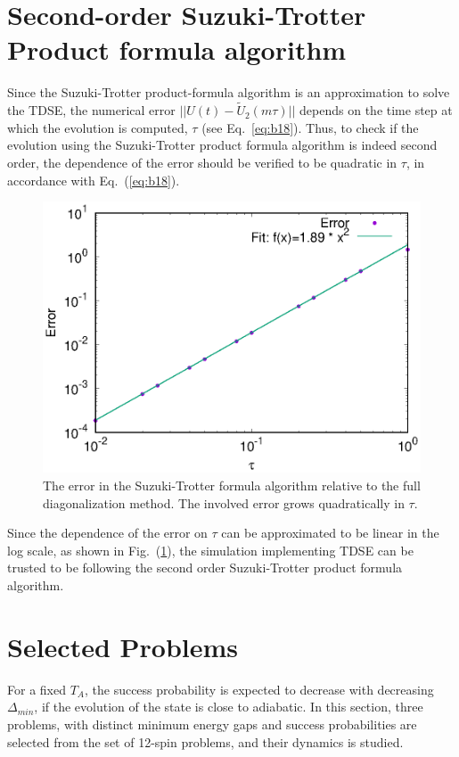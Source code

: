 \documentclass[../main.tex]{subfiles}
\begin{document}
\section{Second-order Suzuki-Trotter Product formula algorithm}
Since the Suzuki-Trotter product-formula algorithm is an approximation to solve the TDSE, the numerical error $\lvert \lvert U(t)-\tilde{U}_2(m \tau) \rvert \rvert $ depends on the time step at which the evolution is computed, $\tau$ (see Eq.~\ref{eq:b18}). 
Thus, to check if the evolution using the Suzuki-Trotter product formula algorithm is indeed second order, the dependence of the error should be verified to be quadratic in $\tau$, in accordance with Eq.~(\ref{eq:b18}). 
\begin{figure}[H]
\centering 
\includegraphics[scale=0.8]{Error.eps}
\caption{The error in the Suzuki-Trotter formula algorithm relative to the full diagonalization method. The involved error grows quadratically in $\tau$.}
\label{fig:o1}
\end{figure}
Since the dependence of the error on $\tau$ can be approximated to be linear in the log scale, as shown in Fig.~(\ref{fig:o1}), the simulation implementing TDSE can be trusted to be following the second order Suzuki-Trotter product formula algorithm.

\section{Selected Problems}
For a fixed $T_A$, the success probability is expected to decrease with decreasing $\Delta_{min}$, if the evolution of the state is close to adiabatic. In this section, three problems, with distinct minimum energy gaps and success probabilities are selected from the set of 12-spin problems, and their dynamics is studied.\\
\end{document}

